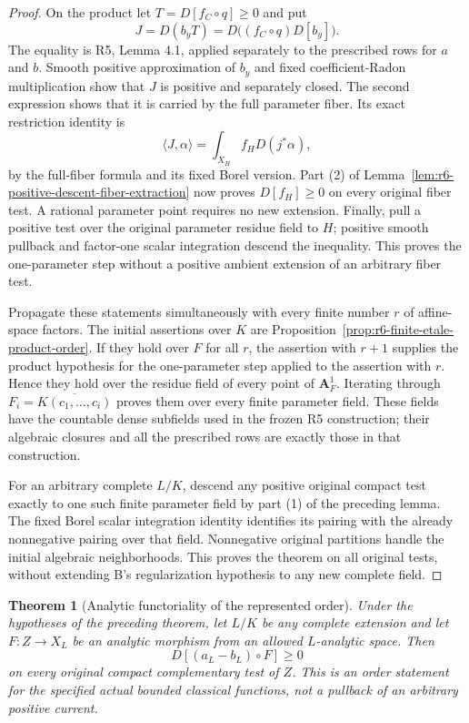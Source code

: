 \documentclass[11pt,a4paper]{article}
\numberwithin{equation}{section}
\newtheorem{theorem}{Theorem}[section]
\theoremstyle{definition}
\theoremstyle{remark}
\begin{document}
\begin{proof}
On the product let $T=D[f_C\circ q]\geq0$ and put
\[
             J=D(b_yT)=D\bigl((f_C\circ q)D[b_y]\bigr).
\]
The equality is R5, Lemma 4.1, applied separately to the prescribed
rows for $a$ and $b$. Smooth positive approximation of $b_y$ and
fixed coefficient-Radon multiplication show that $J$ is positive
and separately closed. The second expression shows that it is
carried by the full parameter fiber. Its exact restriction identity
is
\[
                \langle J,\alpha\rangle
                     =\int_{X_H} f_H D(j^*\alpha),
\]
by the full-fiber formula and its fixed Borel version. Part (2) of
Lemma~\ref{lem:r6-positive-descent-fiber-extraction} now proves
$D[f_H]\geq0$ on every original fiber test. A rational parameter
point requires no new extension. Finally, pull a positive test
over the original parameter residue field to $H$; positive smooth
pullback and factor-one scalar integration descend the inequality.
This proves the one-parameter step without a positive ambient
extension of an arbitrary fiber test.

Propagate these statements simultaneously with every finite number
$r$ of affine-space factors. The initial assertions over $K$ are
Proposition~\ref{prop:r6-finite-etale-product-order}. If they hold
over $F$ for all $r$, the assertion with $r+1$ supplies the product
hypothesis for the one-parameter step applied to the assertion
with $r$. Hence they hold over the residue field of every point
of $\mathbf A_F^1$. Iterating through
$F_i=\overline{K(c_1,\ldots,c_i)}$ proves them over every finite
parameter field. These fields have the countable dense subfields
used in the frozen R5 construction; their algebraic closures and
all the prescribed rows are exactly those in that construction.

For an arbitrary complete $L/K$, descend any positive original
compact test exactly to one such finite parameter field by part (1)
of the preceding lemma. The fixed Borel scalar integration identity
identifies its pairing with the already nonnegative pairing over
that field. Nonnegative original partitions handle the initial
algebraic neighborhoods. This proves the theorem on all original
tests, without extending B's regularization hypothesis to any new
complete field.
\end{proof}

\begin{theorem}[Analytic functoriality of the represented order]
\label{thm:r6-all-extension-analytic-order}
Under the hypotheses of the preceding theorem, let $L/K$ be any
complete extension and let $F:Z\to X_L$ be an analytic morphism
from an allowed $L$-analytic space. Then
\[
                       D[(a_L-b_L)\circ F]\geq0
\]
on every original compact complementary test of $Z$.
This is an order statement for the specified actual bounded
classical functions, not a pullback of an arbitrary positive current.
\end{theorem}
\end{document}
